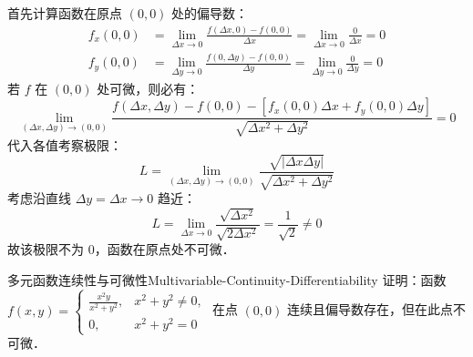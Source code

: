\begin{myproof}
    首先计算函数在原点 $(0,0)$ 处的偏导数：
    \begin{equation}
        \begin{aligned}
            f_x(0,0) & = \lim_{\Delta x \to 0} \frac{f(\Delta x, 0) - f(0,0)}{\Delta x} = \lim_{\Delta x \to 0} \frac{0}{ \Delta x} = 0 \\
            f_y(0,0) & = \lim_{\Delta y \to 0} \frac{f(0, \Delta y) - f(0,0)}{\Delta y} = \lim_{\Delta y \to 0} \frac{0}{ \Delta y} = 0
        \end{aligned}
    \end{equation}
    若 $f$ 在 $(0,0)$ 处可微，则必有：
    \begin{equation}
        \lim_{(\Delta x, \Delta y) \to (0,0)} \frac{f(\Delta x, \Delta y) - f(0,0) - [f_x(0,0)\Delta x + f_y(0,0)\Delta y]}{\sqrt{\Delta x^2 + \Delta y^2}} = 0
    \end{equation}
    代入各值考察极限：
    \begin{equation}
        L = \lim_{(\Delta x, \Delta y) \to (0,0)} \frac{\sqrt{|\Delta x \Delta y|}}{\sqrt{\Delta x^2 + \Delta y^2}}
    \end{equation}
    考虑沿直线 $\Delta y = \Delta x \to 0$ 趋近：
    \begin{equation}
        L = \lim_{\Delta x \to 0} \frac{\sqrt{\Delta x^2}}{\sqrt{2\Delta x^2}} = \frac{1}{\sqrt{2}} \neq 0
    \end{equation}
    故该极限不为 $0$，函数在原点处不可微．
\end{myproof}


\begin{problem}{多元函数连续性与可微性}{Multivariable-Continuity-Differentiability}
    证明：函数 $f(x, y) = \begin{cases} \frac{x^2 y}{x^2 + y^2}, & x^2 + y^2 \neq 0, \\ 0, & x^2 + y^2 = 0 \end{cases}$ 在点 $(0, 0)$ 连续且偏导数存在，但在此点不可微．
\end{problem}

